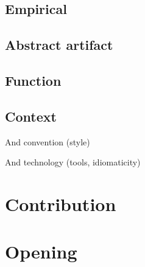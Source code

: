 \subsection{Empirical}

\subsection{Abstract artifact} %

\subsection{Function} %

\subsection{Context} %

And convention (style)

And technology (tools, idiomaticity)

\section{Contribution}




\section{Opening} %



